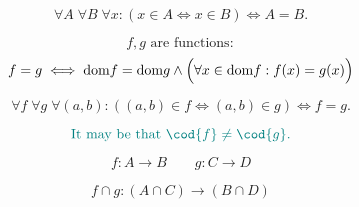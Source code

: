 
\begin{frame}{}
  \begin{center}
  \end{center}
\end{frame}

\begin{frame}{}
  \begin{axiom}
    \[
      \forall A\; \forall B\; \forall x: (x \in A \iff x \in B) \iff A = B.
    \]
  \end{axiom}

  \pause
  \vspace{0.50cm}
  \begin{theorem}
    \[
      f, g \text{ are functions}:
    \]
    \[
      f = g \iff \text{dom}{f} = \text{dom}{g} \land \Big(\forall x \in \text{dom}{f}: f(x) = g(x)\Big)
    \]
  \end{theorem}

  \pause
  \[
    \forall f\; \forall g\; \forall (a, b): ((a, b) \in f \iff (a, b) \in g) \iff f = g.
  \]

  \pause
  \[
    \teal{\text{It may be that } \cod{f} \neq \cod{g}.}
  \]
\end{frame}

\begin{frame}{}
  \[
    f: A \to B \qquad g: C \to D
  \]

  \begin{center}
  \end{center}

  \pause
  \begin{theorem}
    \[
      f \cap g: (A \cap C) \to (B \cap D)
    \]
  \end{theorem}
\end{frame}


